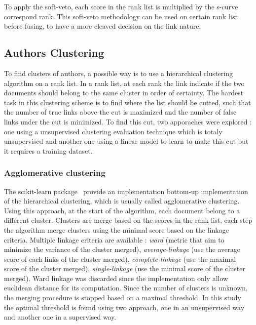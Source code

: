 To apply the soft-veto, each score in the rank list is multiplied by the s-curve correspond rank.
This soft-veto methodology can be used on certain rank list before fusing, to have a more cleaved decision on the link nature.

\subsection{Authors Clustering}

To find clusters of authors, a possible way is to use a hierarchical clustering algorithm on a rank list.
In a rank list, at each rank the link indicate if the two documents should belong to the same cluster in order of certainty.
The hardest task in this clustering scheme is to find where the list should be cutted, such that the number of true links above the cut is maximized and the number of false links under the cut is minimized.
To find this cut, two apporaches were explored : one using a unsupervised clustering evaluation technique which is totaly unsupervised and another one using a linear model to learn to make this cut but it requires a training dataset.

\subsubsection{Agglomerative clustering}

The scikit-learn package~\cite{sklearn} provide an implementation bottom-up implementation of the hierarchical clustering, which is usually called agglomerative clustering.
Using this approach, at the start of the algorithm, each document belong to a different cluster.
Clusters are merge based on the scores in the rank list, each step the algorithm merge clusters using the minimal score based on the linkage criteria.
Multiple linkage criteria are available : \textit{ward} (metric that aim to minimize the variance of the cluster merged), \textit{average-linkage} (use the average score of each links of the cluster merged), \textit{complete-linkage} (use the maximal score of the cluster merged), \textit{single-linkage} (use the minimal score of the cluster merged).
Ward linkage was discarded since the implementation only allow euclidean distance for its computation.
Since the number of clusters is unknown, the merging procedure is stopped based on a maximal threshold.
In this study the optimal threshold is found using two approach, one in an unsupervised way and another one in a supervised way.


